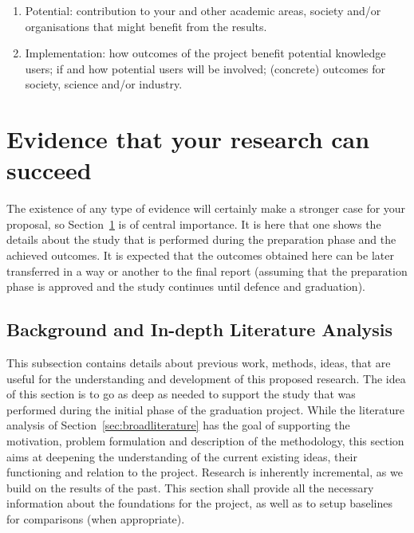 \documentclass{article}
\begin{document}
\begin{enumerate}
\item Potential: contribution to your and other academic areas, society and/or organisations that might benefit from the results. 

\item Implementation: how outcomes of the project benefit potential knowledge users; if and how potential users will be involved; (concrete) outcomes for society, science and/or industry.
\end{enumerate}


\section{Evidence that your research can succeed}\label{sec:evidence}

The existence of any type of evidence will certainly make a stronger case for your proposal, so Section~\ref{sec:evidence} is of central importance. It is here that one shows the details about the study that is performed during the preparation phase and the achieved outcomes. It is expected that the outcomes obtained here can be later transferred in a way or another to the final report (assuming that the preparation phase is approved and the study continues until defence and graduation).

\subsection{Background and In-depth Literature Analysis}\label{sec:background}

This subsection contains details about previous work, methods, ideas, that are useful for the understanding and development of this proposed research. The idea of this section is to go as deep as needed to support the study that was performed during the initial phase of the graduation project. While the literature analysis of Section~\ref{sec:broadliterature} has the goal of supporting the motivation, problem formulation and description of the methodology, this section aims at deepening the understanding of the current existing ideas, their functioning and relation to the project. Research is inherently incremental, as we build on the results of the past. This section shall provide all the necessary information about the foundations for the project, as well as to setup baselines for comparisons (when appropriate).
\end{document}
